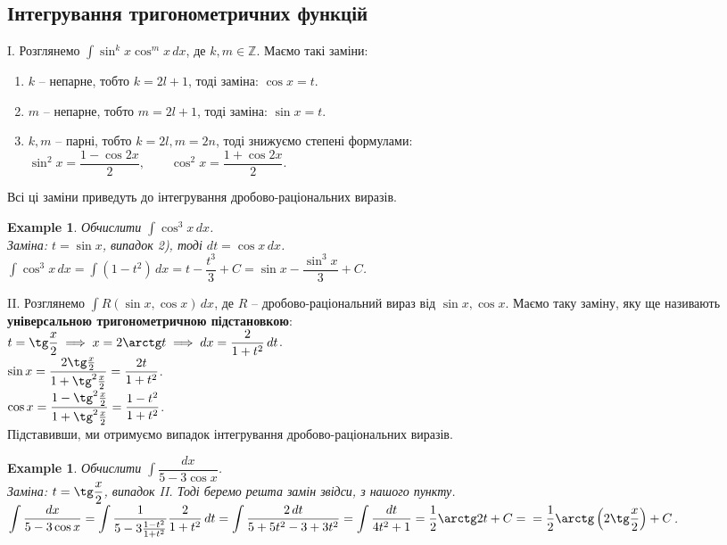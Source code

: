 \documentclass[a4paper, 10pt]{article}
\def\huge{\displaystyle}
\theoremstyle{theoremdd}
\theoremstyle{theoremdd}
\theoremstyle{theoremdd}
\theoremstyle{theoremdd}
\theoremstyle{theoremdd}
\newtheorem{example}[theorem]{Example}
\theoremstyle{theoremdd}
\theoremstyle{theoremdd}
\theoremstyle{theoremdd}
\theoremstyle{theoremdd}
\begin{document}
\subsection{Інтегрування тригонометричних функцій}
I. Розглянемо $\huge \int \sin^k x \cos^m x \,dx$, \quad де $k,m \in \mathbb{Z}$. Маємо такі заміни:\\
\begin{enumerate}[nosep,wide=0pt,label={\arabic*)}]
\item $k$ -- непарне, тобто $k = 2l+1$, тоді заміна: $\cos x = t$.
\item $m$ -- непарне, тобто $m = 2l+1$, тоді заміна: $\sin x = t$.
\item $k,m$ -- парні, тобто $k=2l, m =2n$, тоді знижуємо степені формулами: \\
$\sin^2 x = \dfrac{1-\cos 2x}{2}, \qquad \cos^2 x = \dfrac{1+\cos 2x}{2}$.
\end{enumerate}
Всі ці заміни приведуть до інтегрування дробово-раціональних виразів.

\begin{example}
Обчислити $\huge\int \cos^3 x \,dx$.\\
Заміна: $t = \sin x$, випадок 2), тоді $dt = \cos x \,dx$.\\
$\huge\int \cos^3 x \,dx = \int (1-t^2)\,dx = t - \dfrac{t^3}{3} + C = \sin x - \dfrac{\sin^3 x}{3} + C$.
\end{example}

II. Розглянемо $\huge \int R(\sin x, \cos x)\,dx$, \quad де $R$ -- дробово-раціональний вираз від $\sin x, \cos x$. Маємо таку заміну, яку ще називають \textbf{універсальною тригонометричною підстановкою}:\\
$t = \tg \dfrac{x}{2} \implies x = 2 \arctg t \implies dx = \dfrac{2}{1+t^2}\,dt$.\\
$\sin x = \dfrac{2 \tg \frac{x}{2}}{1 + \tg^2 \frac{x}{2}} = \dfrac{2t}{1+t^2}$.\\
$\cos x = \dfrac{1 - \tg^2 \frac{x}{2}}{1 + \tg^2 \frac{x}{2}} = \dfrac{1-t^2}{1+t^2}$.\\
Підставивши, ми отримуємо випадок інтегрування дробово-раціональних виразів.

\begin{example}
Обчислити $\huge \int \dfrac{dx}{5-3\cos x}$.\\
Заміна: $t = \tg \dfrac{x}{2}$, випадок II. Тоді беремо решта замін звідси, з нашого пункту.\\
$\huge \int \dfrac{dx}{5-3\cos x} = \int \dfrac{1}{5-3 \frac{1-t^2}{1+t^2}} \dfrac{2}{1+t^2}\,dt = \int \dfrac{2\,dt}{5+5t^2-3+3t^2} = \int \dfrac{dt}{4t^2+1} = \dfrac{1}{2} \arctg 2t + C = \\ = \dfrac{1}{2} \arctg \left(2 \tg \dfrac{x}{2} \right) + C$.
\end{example}
\end{document}
